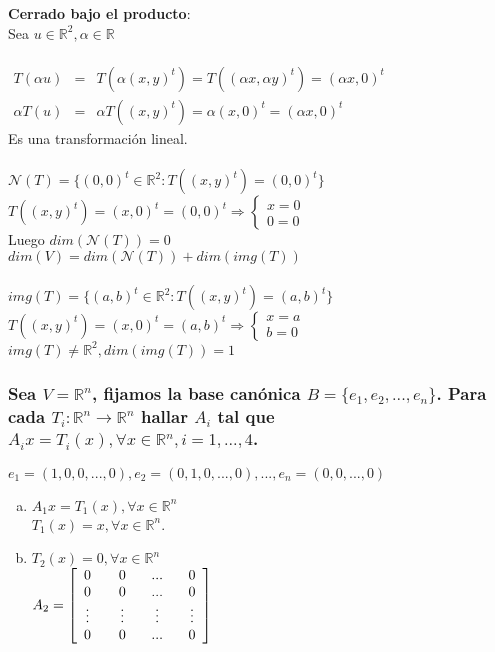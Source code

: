 \documentclass{article}
\begin{document}
\begin{enumerate}[a.]
		\textbf{Cerrado bajo el producto}: \\
		Sea $u \in \mathbb{R}^2, \alpha \in \mathbb{R}$ \\ \\
		$
		\begin{array}{rlc}
		T(\alpha u) &=& T(\alpha (x,y)^t) = T( (\alpha x, \alpha y)^t ) = (\alpha x, 0)^t \\
		\alpha T(u) &=& \alpha T((x,y)^t) = \alpha (x,0)^t = (\alpha x,0)^t
		\end{array}
		$ \\
		Es una transformación lineal.
		\\ \\
		$\mathcal{N}(T) = \{ (0,0)^t \in \mathbb{R}^2 : T((x,y)^t) = (0,0)^t \}$ \\
		$T((x,y)^t) = (x,0)^t = (0,0)^t \Rightarrow \begin{cases} x=0 \\ 0=0 \end{cases}$
		\\
		Luego $dim(\mathcal{N}(T)) = 0$
		\\
		$dim(V) = dim(\mathcal{N}(T)) + dim(img(T))$ \\
		\\
		$img(T) = \{ (a,b)^t \in \mathbb{R}^2 : T((x,y)^t) = (a,b)^t \}$ \\
		$T((x,y)^t) = (x,0)^t = (a,b)^t \Rightarrow \begin{cases} x=a \\ b=0 \end{cases}$ \\
		$img(T) \not = \mathbb{R}^2, dim(img(T))=1$
\end{enumerate}

\subsubsection{Sea $V = \mathbb{R}^n$, fijamos la base canónica $B = \{ e_1,e_2,...,e_n\}$. Para cada $T_i : \mathbb{R}^n \rightarrow
\mathbb{R}^n$ hallar $A_i$ tal que $A_ix = T_i(x), \forall x \in \mathbb{R}^n, i = 1,...,4$.}
$e_1 = (1,0,0,...,0), e_2 = (0,1,0,...,0), ..., e_n = (0,0,...,0)$

\begin{enumerate}[a.]
	\item
		$A_1x = T_1(x), \forall x \in \mathbb{R}^n$ \\
		$T_1(x) = x, \forall x \in \mathbb{R}^n$. \\
		
	\item
		$T_2(x) = 0, \forall x \in \mathbb{R}^n$ \\
		$A_2 = \begin{bmatrix} 0 & 0 & ... & 0 \\ 0 & 0 & ... & 0 \\ \vdotswithin{\ldots} & 
		\vdotswithin{\ldots} & \vdotswithin{\ldots} & \vdotswithin{\ldots} \\ 0&0 &...& 0 \end{bmatrix}$
\end{enumerate}
\end{document}
